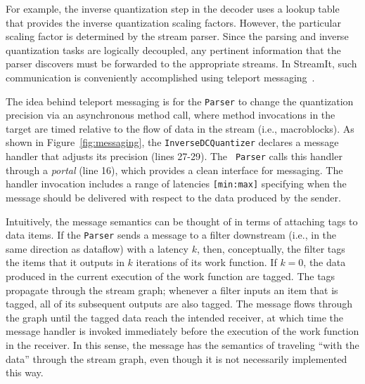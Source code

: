 For example, the inverse quantization step in the decoder uses a
lookup table that provides the inverse quantization scaling factors.
However, the particular scaling factor is determined by the stream
parser. Since the parsing and inverse quantization tasks are logically
decoupled, any pertinent information that the parser discovers must be
forwarded to the appropriate streams.  In StreamIt, such
communication is conveniently accomplished using teleport
messaging~\cite{thies05ppopp}.

The idea behind teleport messaging is for the {\tt Parser} to change
the quantization precision via an asynchronous method call, where
method invocations in the target are timed relative to the flow of
data in the stream (i.e., macroblocks). As shown in
Figure~\ref{fig:messaging}, the {\tt InverseDCQuantizer} declares a
message handler that adjusts its precision (lines 27-29). The {\tt
Parser} calls this handler through a {\it portal} (line 16), which
provides a clean interface for messaging.  The handler invocation
includes a range of latencies {\tt [min:max]} specifying when the
message should be delivered with respect to the data produced by the
sender.

Intuitively, the message semantics can be thought of in terms of
attaching tags to data items.  If the {\tt Parser} sends a message to
a filter downstream (i.e., in the same direction as dataflow) with a
latency $k$, then, conceptually, the filter tags the items that it
outputs in $k$ iterations of its work function. If $k=0$, the data
produced in the current execution of the work function are tagged. The
tags propagate through the stream graph; whenever a filter inputs an
item that is tagged, all of its subsequent outputs are also
tagged. The message flows through the graph until the tagged data
reach the intended receiver, at which time the message handler is
invoked immediately before the execution of the work function in the
receiver.  In this sense, the message has the semantics of traveling
``with the data'' through the stream graph, even though it is not
necessarily implemented this way.


